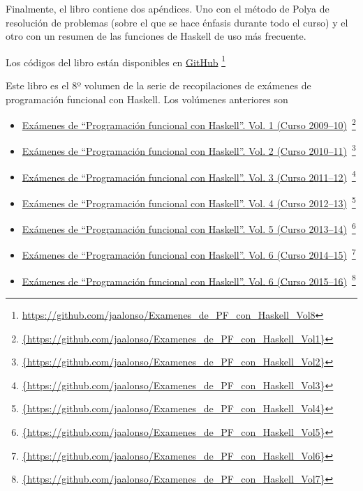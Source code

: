 \documentclass[a4paper,12pt,twoside]{book}
\begin{document}
Finalmente, el libro contiene dos apéndices. Uno con el método de Polya
de resolución de problemas (sobre el que se hace énfasis durante todo el
curso) y el otro con un resumen de las funciones de Haskell de uso más
frecuente.

Los códigos del libro están disponibles en
\href{https://github.com/jaalonso/Examenes_de_PF_con_Haskell_Vol8}
     {GitHub}
     \footnote{{\url{https://github.com/jaalonso/Examenes_de_PF_con_Haskell_Vol8}}}

Este libro es el 8º volumen de la serie de recopilaciones de
exámenes de programación funcional con Haskell. Los volúmenes anteriores son
\begin{itemize}
\item
  \href{https://github.com/jaalonso/Examenes_de_PF_con_Haskell_Vol1}
  {Exámenes de ``Programaci\'on funcional con Haskell''.
    Vol. 1 (Curso 2009--10)}\
    \footnote{\url{{https://github.com/jaalonso/Examenes_de_PF_con_Haskell_Vol1}}}

\item
  \href{https://github.com/jaalonso/Examenes_de_PF_con_Haskell_Vol2}
  {Exámenes de ``Programaci\'on funcional con Haskell''.
    Vol. 2 (Curso 2010--11)}\
    \footnote{\url{{https://github.com/jaalonso/Examenes_de_PF_con_Haskell_Vol2}}}

\item
  \href{https://github.com/jaalonso/Examenes_de_PF_con_Haskell_Vol3}
  {Exámenes de ``Programaci\'on funcional con Haskell''.
    Vol. 3 (Curso 2011--12)}\
    \footnote{\url{{https://github.com/jaalonso/Examenes_de_PF_con_Haskell_Vol3}}}

\item
  \href{https://github.com/jaalonso/Examenes_de_PF_con_Haskell_Vol4}
  {Exámenes de ``Programaci\'on funcional con Haskell''.
    Vol. 4 (Curso 2012--13)}\
    \footnote{\url{{https://github.com/jaalonso/Examenes_de_PF_con_Haskell_Vol4}}}

\item
  \href{https://github.com/jaalonso/Examenes_de_PF_con_Haskell_Vol5}
  {Exámenes de ``Programaci\'on funcional con Haskell''.
    Vol. 5 (Curso 2013--14)}\
    \footnote{\url{{https://github.com/jaalonso/Examenes_de_PF_con_Haskell_Vol5}}}

\item
  \href{https://github.com/jaalonso/Examenes_de_PF_con_Haskell_Vol6}
  {Exámenes de ``Programaci\'on funcional con Haskell''.
    Vol. 6 (Curso 2014--15)}\
    \footnote{\url{{https://github.com/jaalonso/Examenes_de_PF_con_Haskell_Vol6}}}

\item
  \href{https://github.com/jaalonso/Examenes_de_PF_con_Haskell_Vol7}
  {Exámenes de ``Programaci\'on funcional con Haskell''.
    Vol. 6 (Curso 2015--16)}\
    \footnote{\url{{https://github.com/jaalonso/Examenes_de_PF_con_Haskell_Vol7}}}

\end{itemize}
     
\end{document}
